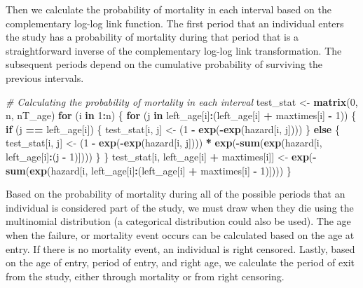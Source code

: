 \documentclass[11pt,]{article}
\newenvironment{Shaded}{\begin{snugshade}}{\end{snugshade}}
\newcommand{\KeywordTok}[1]{\textcolor[rgb]{0.13,0.29,0.53}{\textbf{#1}}}
\newcommand{\DecValTok}[1]{\textcolor[rgb]{0.00,0.00,0.81}{#1}}
\newcommand{\StringTok}[1]{\textcolor[rgb]{0.31,0.60,0.02}{#1}}
\newcommand{\CommentTok}[1]{\textcolor[rgb]{0.56,0.35,0.01}{\textit{#1}}}
\newcommand{\ControlFlowTok}[1]{\textcolor[rgb]{0.13,0.29,0.53}{\textbf{#1}}}
\newcommand{\OperatorTok}[1]{\textcolor[rgb]{0.81,0.36,0.00}{\textbf{#1}}}
\newcommand{\NormalTok}[1]{#1}
\begin{document}
Then we calculate the probability of mortality in each interval based on
the complementary log-log link function. The first period that an
individual enters the study has a probability of mortality during that
period that is a straightforward inverse of the complementary log-log
link transformation. The subsequent periods depend on the cumulative
probability of surviving the previous intervals.

\begin{Shaded}
\begin{Highlighting}[]
  \CommentTok{# Calculating the probability of mortality in each interval}
\NormalTok{  test_stat <-}\StringTok{ }\KeywordTok{matrix}\NormalTok{(}\DecValTok{0}\NormalTok{, n, nT_age)}
  \ControlFlowTok{for}\NormalTok{ (i }\ControlFlowTok{in} \DecValTok{1}\OperatorTok{:}\NormalTok{n) \{}
    \ControlFlowTok{for}\NormalTok{ (j }\ControlFlowTok{in}\NormalTok{ left_age[i]}\OperatorTok{:}\NormalTok{(left_age[i] }\OperatorTok{+}\StringTok{ }\NormalTok{maxtimes[i] }\OperatorTok{-}\StringTok{ }\DecValTok{1}\NormalTok{)) \{}
      \ControlFlowTok{if}\NormalTok{ (j }\OperatorTok{==}\StringTok{ }\NormalTok{left_age[i]) \{}
\NormalTok{        test_stat[i, j] <-}\StringTok{ }\NormalTok{(}\DecValTok{1} \OperatorTok{-}\StringTok{ }\KeywordTok{exp}\NormalTok{(}\OperatorTok{-}\KeywordTok{exp}\NormalTok{(hazard[i, j])))}
\NormalTok{      \} }\ControlFlowTok{else}\NormalTok{ \{}
\NormalTok{        test_stat[i, j] <-}
\StringTok{           }\NormalTok{(}\DecValTok{1} \OperatorTok{-}\StringTok{ }\KeywordTok{exp}\NormalTok{(}\OperatorTok{-}\KeywordTok{exp}\NormalTok{(hazard[i, j]))) }\OperatorTok{*}
\StringTok{           }\KeywordTok{exp}\NormalTok{(}\OperatorTok{-}\KeywordTok{sum}\NormalTok{(}\KeywordTok{exp}\NormalTok{(hazard[i, left_age[i]}\OperatorTok{:}\NormalTok{(j }\OperatorTok{-}\StringTok{ }\DecValTok{1}\NormalTok{)])))}
\NormalTok{      \}}
\NormalTok{    \}}
\NormalTok{    test_stat[i, left_age[i] }\OperatorTok{+}\StringTok{ }\NormalTok{maxtimes[i]] <-}
\StringTok{            }\KeywordTok{exp}\NormalTok{(}\OperatorTok{-}\KeywordTok{sum}\NormalTok{(}\KeywordTok{exp}\NormalTok{(hazard[i, left_age[i]}\OperatorTok{:}\NormalTok{(left_age[i]}
            \OperatorTok{+}\StringTok{ }\NormalTok{maxtimes[i] }\OperatorTok{-}\StringTok{ }\DecValTok{1}\NormalTok{)])))}
\NormalTok{  \}}
\end{Highlighting}
\end{Shaded}

Based on the probability of mortality during all of the possible periods
that an individual is considered part of the study, we must draw when
they die using the multinomial distribution (a categorical distribution
could also be used). The age when the failure, or mortality event occurs
can be calculated based on the age at entry. If there is no mortality
event, an individual is right censored. Lastly, based on the age of
entry, period of entry, and right age, we calculate the period of exit
from the study, either through mortality or from right censoring.
\end{document}

